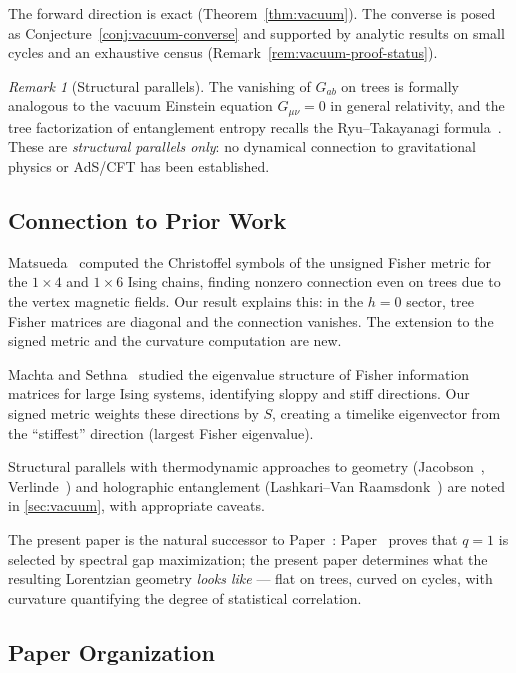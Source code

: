 \documentclass[11pt]{article}
\theoremstyle{definition}
\theoremstyle{remark}
\newtheorem{remark}[theorem]{Remark}
\newcommand{\sgn}{S}
\newcommand{\Ein}{G}
\begin{document}
The forward direction is exact (Theorem~\ref{thm:vacuum}).
The converse is posed as Conjecture~\ref{conj:vacuum-converse} and
supported by analytic results on small cycles and an exhaustive census
(Remark~\ref{rem:vacuum-proof-status}).

\begin{remark}[Structural parallels]
The vanishing of $\Ein_{ab}$ on trees is formally analogous to the
vacuum Einstein equation $G_{\mu\nu} = 0$ in general relativity, and
the tree factorization of entanglement entropy recalls the
Ryu--Takayanagi formula~\cite{RyuTakayanagi2006}.
These are \emph{structural parallels only}: no dynamical connection
to gravitational physics or AdS/CFT has been established.
\end{remark}

\subsection{Connection to Prior Work}

Matsueda~\cite{Matsueda2013} computed the Christoffel symbols of the
unsigned Fisher metric for the $1 \times 4$ and $1 \times 6$ Ising chains,
finding nonzero connection even on trees due to the vertex magnetic fields.
Our result explains this: in the $h = 0$ sector, tree Fisher matrices are
diagonal and the connection vanishes. The extension to the signed metric
and the curvature computation are new.

Machta and Sethna~\cite{Machta2013} studied the eigenvalue structure of
Fisher information matrices for large Ising systems, identifying sloppy and
stiff directions. Our signed metric weights these directions by $\sgn$,
creating a timelike eigenvector from the ``stiffest'' direction (largest
Fisher eigenvalue).

Structural parallels with thermodynamic approaches to geometry
(Jacobson~\cite{Jacobson1995}, Verlinde~\cite{Verlinde2011}) and
holographic entanglement (Lashkari--Van Raamsdonk~\cite{Lashkari2014})
are noted in \cref{sec:vacuum}, with appropriate caveats.

The present paper is the natural successor to Paper~\cite{Paper5}:
Paper~\cite{Paper5} proves that $q = 1$ is selected by spectral gap
maximization; the present paper determines what the resulting Lorentzian
geometry \emph{looks like} --- flat on trees, curved on cycles, with
curvature quantifying the degree of statistical correlation.

\subsection{Paper Organization}
\end{document}
